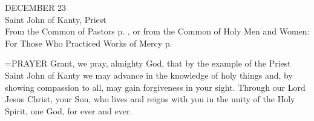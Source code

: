 \begin{center}\normalsize DECEMBER 23\\
\footnotesize Saint John of Kanty, Priest\\
\footnotesize From the Common of Pastors p.   , or from the Common of Holy Men and Women:\\
\footnotesize For Those Who Practiced Works of Mercy p.\\
\end{center}

\hangindent=\parindent \small{PRAYER 
Grant, we pray, almighty God,
that by the example of the Priest Saint John of Kanty
we may advance in the knowledge of holy things
and, by showing compassion to all,
may gain forgiveness in your sight.
Through our Lord Jesus Christ, your Son,
who lives and reigns with you in the unity of the Holy Spirit,
one God, for ever and ever.\\}
 
